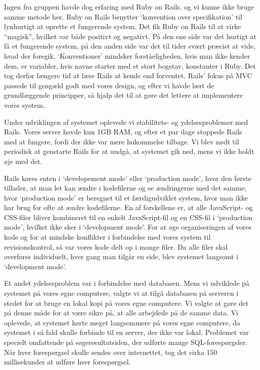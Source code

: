 Ingen fra gruppen havde dog erfaring med Ruby on Rails, og vi kunne ikke bruge samme metode her. Ruby on Rails benytter `konvention over specifikation' til lynhurtigt at oprette et fungerende system. Det fik Ruby on Rails til at virke ``magisk'', hvilket var både positivt og negativt. På den ene side var det hurtigt at få et fungerende system, på den anden side var det til tider svært præcist at vide, hvad der foregik. `Konventioner' mindsker forståeligheden, hvis man ikke kender dem, \fx er variabler, hvis navne starter med et stort bogstav, konstanter i Ruby. Det tog derfor længere tid at lære Rails at kende end forventet. 
Rails' fokus på MVC passede til gengæld godt med vores design, og efter vi havde lært de grundlæggende principper, så hjalp det til at gøre det lettere at implementere vores system.

Under udviklingen af systemet oplevede vi stabilitets- og ydelsesproblemer med Rails. Vores server havde kun 1GB RAM, og efter et par dage stoppede Rails med at fungere, fordi der ikke var mere hukommelse tilbage. Vi blev nødt til periodisk at genstarte Rails for at undgå, at systemet gik ned, mens vi ikke holdt øje med det.

Rails køres enten i `developement mode' eller `production mode', hvor den første tillader, at man let kan ændre i kodefilerne og se ændringerne med det samme, hvor `production mode' er beregnet til et færdigudviklet system, hvor man ikke har brug for ofte at ændre kodefilerne. En af forskellene er, at alle JavaScript- og CSS-filer bliver kombineret til en enkelt JavaScript-fil og en CSS-fil i `production mode', hvilket ikke sker i `development mode'. For at øge organiseringen af vores kode og for at mindske konflikter i forbindelse med vores system til revisionskontrol, så var vores kode delt op i mange filer. Da alle filer skal overføres individuelt, hver gang man tilgår en side, blev systemet langsomt i `development mode'.

Et andet ydelsesproblem var i forbindelse med databasen. Mens vi udviklede på systemet på vores egne computere, valgte vi at tilgå databasen på serveren i stedet for at bruge en lokal kopi på vores egne computere. Vi valgte at gøre det på denne måde for at være sikre på, at alle arbejdede på de samme data. Vi oplevede, at systemet kørte meget langsommere på vores egne computere, da systemet i så fald skulle forbinde til en server, der ikke var lokal. Problemet var specielt omfattende på søgeresultatsiden, der udførte mange SQL-forespørgsler. Når hver forespørgsel skulle sendes over internettet, tog det cirka 150 millisekunder at udføre hver forespørgsel.

